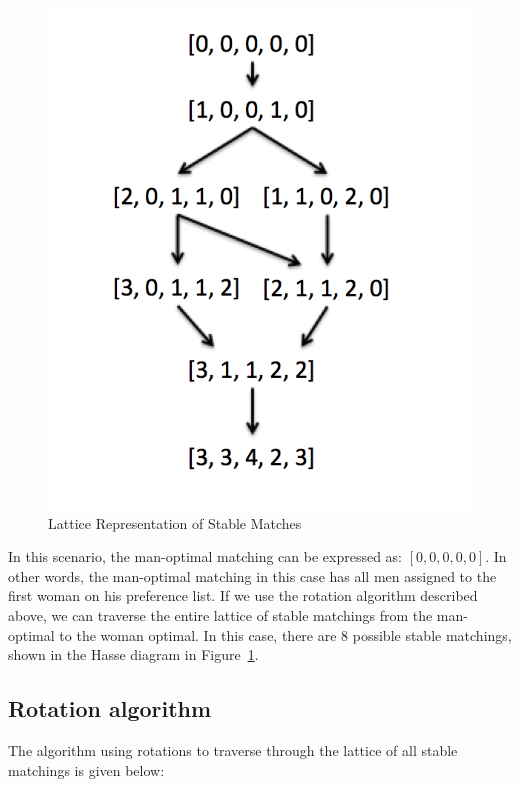 \documentclass[a4paper]{article}
\begin{document}
\begin{figure}
\centering
\vspace{-20pt}
\includegraphics[scale=0.6]{stable_matching_poset.png}
\vspace{-10pt}
\caption{Lattice Representation of Stable Matches}
\label{fig:lattice}
\vspace{-20pt}
\end{figure}

In this scenario, the man-optimal matching can be expressed as: $[0,0,0,0,0]$. In other words, the man-optimal matching in this case has all men assigned to the first woman on his preference list. If we use the rotation algorithm described above, we can traverse the entire lattice of stable matchings from the man-optimal to the woman optimal. In this case, there are 8 possible stable matchings, shown in the Hasse diagram in Figure~\ref{fig:lattice}.

\subsection{Rotation algorithm}
The algorithm using rotations to traverse through the lattice of all stable matchings is given below:
\end{document}
